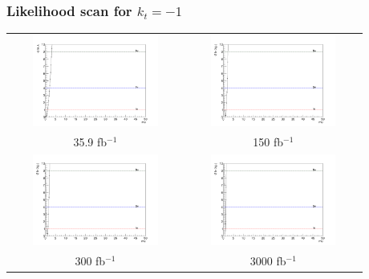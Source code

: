 \documentclass[11pt]{beamer}
\begin{document}
{\nologo
	\begin{frame}
	\frametitle{Likelihood scan for  $k_t=-1$}
	\begin{center}
		\begin{tabular}{cc}
			\includegraphics[width=5.5cm,height=3cm]{figures/kt-1/35.9fb/Likelihood-kt-1.png} &
			\includegraphics[width=5.5cm,height=3cm]{figures/kt-1/150fb/Likelihood.png}\\ 
			\scriptsize{35.9 fb$^{-1}$} & \scriptsize{150 fb$^{-1}$} \\
			\includegraphics[width=5.5cm,height=3cm]{figures/kt-1/300fb/Likelihood.png}&
			\includegraphics[width=5.5cm,height=3cm]{figures/kt-1/3000fb/Likelihood.png}\\
			\scriptsize{300 fb$^{-1}$} & \scriptsize{3000 fb$^{-1}$} \\
		\end{tabular}
	\end{center}
\end{frame}
}
\end{document}
